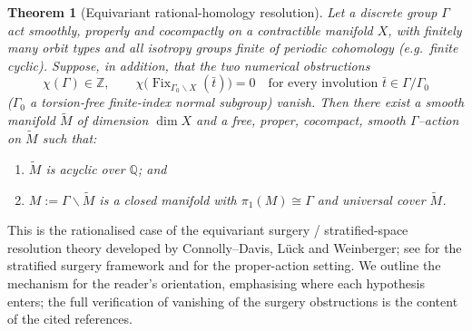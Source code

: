 \documentclass[12pt]{article}
\newcommand{\bQ}{\mathbb{Q}}
\newcommand{\bZ}{\mathbb{Z}}
\newcommand{\Fix}{\operatorname{Fix}}
\newtheorem{theorem}{Theorem}
\theoremstyle{definition}
\begin{document}
\begin{theorem}[Equivariant rational-homology resolution]\label{thm:resolution}
Let a discrete group $\Gamma$ act smoothly, properly and cocompactly on a
contractible manifold $X$, with finitely many orbit types and all isotropy groups
finite of \emph{periodic cohomology} \textup{(}e.g.\ finite cyclic\textup{)}.
Suppose, in addition, that the two numerical obstructions
\[
   \chi(\Gamma)\in\bZ,
   \qquad
   \chi\bigl(\Fix_{\Gamma_0\backslash X}(\bar t)\bigr)=0
   \quad\text{for every involution }\bar t\in\Gamma/\Gamma_0
\]
\textup{(}$\Gamma_0$ a torsion-free finite-index normal subgroup\textup{)} vanish.
Then there exist a smooth manifold $\widetilde M$ of dimension $\dim X$ and a
free, proper, cocompact, smooth $\Gamma$--action on $\widetilde M$ such that:
\begin{enumerate}
\item[\textup{(i)}] $\widetilde M$ is acyclic over $\bQ$; and
\item[\textup{(ii)}] $M:=\Gamma\backslash\widetilde M$ is a closed manifold with
$\pi_1(M)\cong\Gamma$ and universal cover $\widetilde M$.
\end{enumerate}
\end{theorem}

This is the rationalised case of the equivariant surgery / stratified-space
resolution theory developed by Connolly--Davis, L\"uck and Weinberger; see
\cite[Ch.~II,~V]{Weinberger} for the stratified surgery framework and
\cite{Lueck} for the proper-action setting.  We outline the mechanism for the
reader's orientation, emphasising where each hypothesis enters; the full
verification of vanishing of the surgery obstructions is the content of the cited
references.
\end{document}
